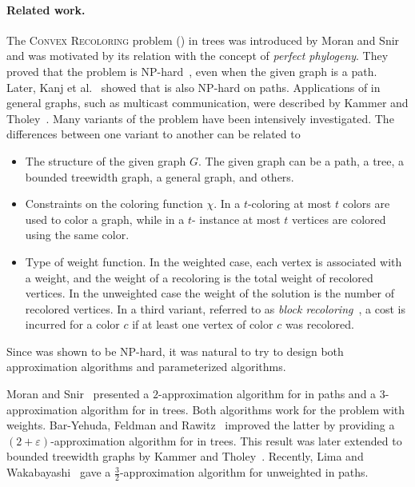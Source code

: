 \paragraph*{Related work.}
%
The \textsc{Convex Recoloring} problem (\CRP{}) in trees was
introduced by Moran and Snir~\cite{MoranSnir08} and was motivated by
its relation with the concept of \emph{perfect phylogeny}.  They
proved that the problem is NP-hard~\cite{kanj2009convex}, even when
the given graph is a path.  Later, Kanj et
al.~\cite{kanj2009convex} showed that \TWOCR{} is also NP-hard on
paths.
%
Applications of \CRP{} in general graphs, 
such as multicast communication, 
were described by Kammer and Tholey~\cite{kammer2012complexity}.
%
Many variants of the problem have been intensively investigated.
%
The differences between one variant to another can be related to
%
\begin{itemize}
\item The structure of the given graph $G$.
%
The given graph can be a path, 
a tree,
a bounded treewidth graph, 
a general graph, 
and others.
  
\item Constraints on the coloring function $\chi$.
%
In a $t$-coloring at most $t$ colors are used to color a graph,
while in a $t$-\CRP{} instance at most $t$ vertices are colored using the same color.

\item Type of weight function.
%
In the weighted case, 
each vertex is associated with a weight,
and the weight of a recoloring is the total weight of recolored vertices.
%
In the unweighted case the weight of the solution is the number of recolored vertices.
%
In a third variant, 
referred to as \emph{block recoloring}~\cite{kammer2012complexity}, 
a cost is incurred for a color $c$ if at least one vertex of color $c$ was recolored. 
\end{itemize}
%
Since \CRP{} was shown to be NP-hard, it was natural to try to design both
approximation algorithms and parameterized algorithms.


Moran and Snir~\cite{moran2007efficient} presented a $2$-approximation
algorithm for \CRP{} in paths and a $3$-approximation algorithm for \CRP{}
in trees.  
%
Both algorithms work for the problem with weights.
%
Bar-Yehuda, Feldman and Rawitz~\cite{BFR08} improved the
latter by providing a $(2+\varepsilon)$-approximation algorithm for
\CRP{} in trees.  
%
This result was later extended to bounded treewidth graphs by 
Kammer and Tholey~\cite{kammer2012complexity}.
%
Recently, Lima and Wakabayashi~\cite{lima2014convex} gave a 
$\frac{3}{2}$-approximation algorithm for unweighted \TWOCR{} in paths.

